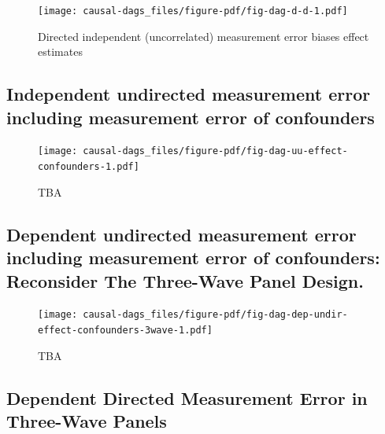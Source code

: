 \documentclass[
  singlecolumn]{report}
\begin{document}
\begin{figure}

{\centering \texttt{[image: causal-dags\_files/figure-pdf/fig-dag-d-d-1.pdf]}

}

\caption{\label{fig-dag-d-d}Directed independent (uncorrelated)
measurement error biases effect estimates}

\end{figure}

\hypertarget{independent-undirected-measurement-error-including-measurement-error-of-confounders}{%
\subsection{Independent undirected measurement error including
measurement error of
confounders}\label{independent-undirected-measurement-error-including-measurement-error-of-confounders}}

\begin{figure}

{\centering \texttt{[image: causal-dags\_files/figure-pdf/fig-dag-uu-effect-confounders-1.pdf]}

}

\caption{\label{fig-dag-uu-effect-confounders}TBA}

\end{figure}

\hypertarget{dependent-undirected-measurement-error-including-measurement-error-of-confounders-reconsider-the-three-wave-panel-design.}{%
\subsection{Dependent undirected measurement error including measurement
error of confounders: Reconsider The Three-Wave Panel
Design.}\label{dependent-undirected-measurement-error-including-measurement-error-of-confounders-reconsider-the-three-wave-panel-design.}}

\begin{figure}

{\centering \texttt{[image: causal-dags\_files/figure-pdf/fig-dag-dep-undir-effect-confounders-3wave-1.pdf]}

}

\caption{\label{fig-dag-dep-undir-effect-confounders-3wave}TBA}

\end{figure}

\hypertarget{dependent-directed-measurement-error-in-three-wave-panels}{%
\subsection{Dependent Directed Measurement Error in Three-Wave
Panels}\label{dependent-directed-measurement-error-in-three-wave-panels}}
\end{document}
